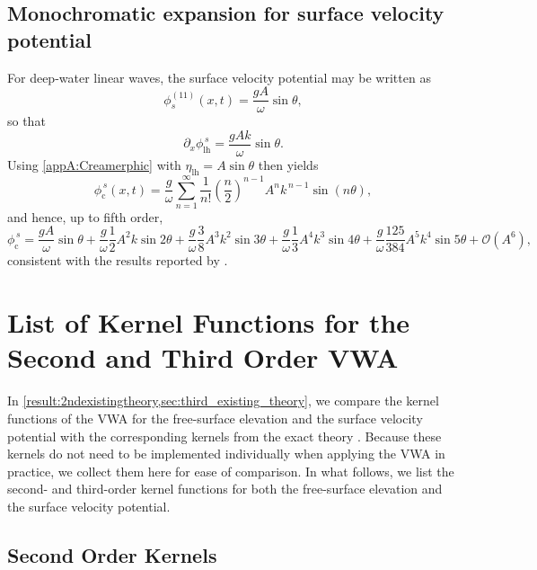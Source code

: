 \documentclass[lineno]{JFM-FLM_Au}
\begin{document}
\begin{appen}
\subsection{Monochromatic expansion for surface velocity potential}

For deep-water linear waves, the surface velocity potential may be written as
\begin{equation}\label{appA:mono_phi}
\phi_s^{(11)}(x,t)=\frac{gA}{\omega}\sin\theta,
\end{equation}
so that
\begin{equation}\label{appA:dx_phi_lh}
\partial_x\phi^{\,s}_{\mathrm{lh}}=\frac{gAk}{\omega}\sin\theta.
\end{equation}
Using \cref{appA:Creamerphic} with $\eta_{\mathrm{lh}}=A\sin\theta$ then yields
\begin{equation}\label{appA:phi_series_general}
\phi^{\,s}_{\mathrm{c}}(x,t)
=
\frac{g}{\omega}
\sum_{n=1}^{\infty}
\frac{1}{n!}\left(\frac{n}{2}\right)^{n-1}
A^n k^{\,n-1}\sin(n\theta),
\end{equation}
and hence, up to fifth order,
\begin{equation}\label{appA:phi_series_2to5}
\phi^{\,s}_{\mathrm{c}}
=
\frac{gA}{\omega}\sin\theta
+\frac{g}{\omega}\frac{1}{2}A^2k\sin 2\theta
+\frac{g}{\omega}\frac{3}{8}A^3k^2\sin 3\theta
+\frac{g}{\omega}\frac{1}{3}A^4k^3\sin 4\theta
+\frac{g}{\omega}\frac{125}{384}A^5k^4\sin 5\theta
+\mathcal{O}(A^6),
\end{equation}
consistent with the results reported by \citet{gibbs_walls_2004}.

\section{List of Kernel Functions for the Second and Third Order VWA}\label{appB}

In \cref{result:2ndexistingtheory,sec:third_existing_theory}, we compare the kernel functions of the VWA for the free-surface elevation and the surface velocity potential with the corresponding kernels from the exact theory \citep{dalzell1999note,sharma1981second,madsen2006third,madsen2012third}. Because these kernels do not need to be implemented individually when applying the VWA in practice, we collect them here for ease of comparison. In what follows, we list the second- and third-order kernel functions for both the free-surface elevation and the surface velocity potential. 

\subsection{Second Order Kernels}


\end{appen}
\end{document}
